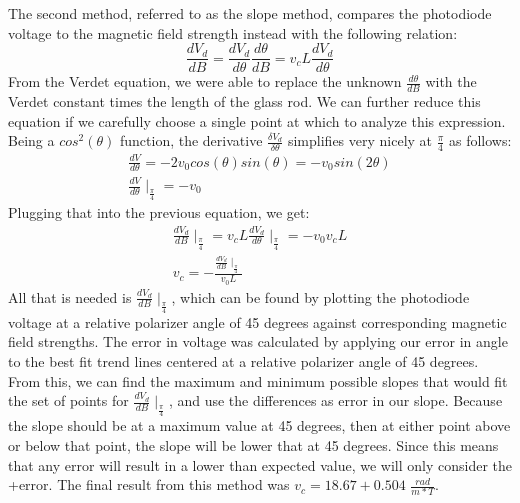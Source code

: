 \documentclass[prb,preprint]{revtex4-1}
\begin{document}
The second method, referred to as the slope method, compares the photodiode voltage to the magnetic field strength instead with the following relation:
\begin{equation}
\frac{dV_d}{dB}= \frac{dV_d}{d\theta }\frac{d\theta }{dB}=v_cL\frac{dV_d}{d\theta }
\end{equation}
From the Verdet equation, we were able to replace the unknown $\frac{d\theta }{dB}$ with the Verdet constant times the length of the glass rod. We can further reduce this equation if we carefully choose a single point at which to analyze this expression. Being a $cos^2(\theta)$ function, the derivative $\frac{\delta V_d}{\delta \theta}$ simplifies very nicely at $\frac{\pi}{4}$ as follows:
\begin{eqnarray}
\label{derivative}
\frac{dV}{d\theta }=-2v_0cos(\theta )sin(\theta )=-v_0sin(2\theta )\\
\frac{dV}{d\theta } \mid_{\frac{\pi }{4}}=-v_0
\end{eqnarray}
Plugging that into the previous equation, we get:
\begin{eqnarray}
\label{slope eqn}
\frac{dV_d}{dB}\mid_\frac{\pi }{4}=v_cL\frac{dV_d}{d\theta }\mid_\frac{\pi }{4}=-v_0v_cL\\
v_c=-\frac{\frac{dV_d}{dB}\mid_\frac{\pi }{4}}{v_0L}
\end{eqnarray}
All that is needed is $\frac{dV_d}{dB}\mid_\frac{\pi }{4}$, which can be found by plotting the photodiode voltage at a relative polarizer angle of 45 degrees against corresponding magnetic field strengths. The error in voltage was calculated by applying our error in angle to the best fit trend lines centered at a relative polarizer angle of 45 degrees. From this, we can find the maximum and minimum possible slopes that would fit the set of points for $\frac{dV_d}{dB}\mid_\frac{\pi }{4}$, and use the differences as error in our slope. Because the slope should be at a maximum value at 45 degrees, then at either point above or below that point, the slope will be lower that at 45 degrees. Since this means that any error will result in a lower than expected value, we will only consider the +error. The final result from this method was $v_c = 18.67 + 0.504$ $\frac{rad}{m*T}$.
\end{document}
